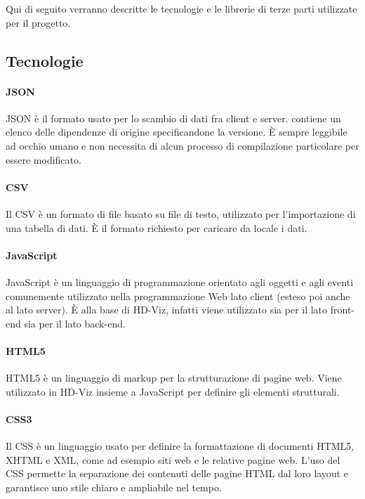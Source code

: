 \documentclass[../manuale_sviluppatore.tex]{subfiles}
\begin{document}
Qui di seguito verranno descritte le tecnologie e le librerie di terze parti utilizzate per il progetto.


\subsection{Tecnologie}

\paragraph{JSON}
JSON è il formato usato per lo scambio di dati fra client e server. contiene un elenco delle dipendenze di origine specificandone la versione. 
È sempre leggibile ad occhio umano e non necessita di alcun processo di compilazione particolare per essere modificato. 

\paragraph{CSV}
Il CSV è un formato di file basato su file di testo, utilizzato per l’importazione di una tabella di dati. 
È il formato richiesto per caricare da locale i dati.

\paragraph{JavaScript}
JavaScript è un linguaggio di programmazione orientato agli oggetti e agli eventi comunemente utilizzato nella programmazione Web lato client (esteso poi anche al lato server). 
È alla base di HD-Viz, infatti viene utilizzato sia per il lato front-end sia per il lato back-end. 

\paragraph{HTML5}
HTML5 è un linguaggio di markup per la strutturazione di pagine web. 
Viene utilizzato in HD-Viz insieme a JavaScript per definire gli elementi strutturali.

\paragraph{CSS3}
Il CSS è un linguaggio usato per definire la formattazione di documenti HTML5, XHTML e XML, come ad esempio siti web e le relative pagine web. 
L’uso del CSS permette la separazione dei contenuti delle pagine HTML dal loro layout e garantisce uno stile chiaro e ampliabile nel tempo. 
\end{document}
